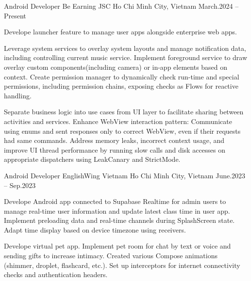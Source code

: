 \begin{cventries}

    \cventry
    {Android Developer}
    {Be Earning JSC}
    {Ho Chi Minh City, Vietnam}
    {March.2024 -- Present}
    {
        \begin{cvitems}
            \item {
                Develope launcher feature to manage user apps alongside enterprise web apps.
            }
            \item {
                Leverage system services to overlay system layouts and manage notification data, including controlling current music service.
                Implement foreground service to draw overlay custom components(including camera) or in-app elements based on context.
                Create permission manager to dynamically check run-time and special permissions, including permission chains, exposing checks as Flows for reactive handling.
            }
            \item {
                Separate business logic into use cases from UI layer to facilitate sharing between activities and services.
                Enhance WebView interaction pattern: Communicate using enums and sent responses only to correct WebView, even if their requests had same commands.
                Address memory leaks, incorrect context usage, and improve UI thread performance by running slow calls and disk accesses on appropriate dispatchers using LeakCanary and StrictMode.
            }
        \end{cvitems}
    }

    \cventry
    {Android Developer}
    {EnglishWing Vietnam}
    {Ho Chi Minh City, Vietnam}
    {June.2023 -- Sep.2023}
    {
        \begin{cvitems}
            \item {
                Develope Android app connected to Supabase Realtime for admin users to manage real-time user information and update latest class time in user app.
                Implement preloading data and real-time channels during SplashScreen state.
                Adapt time display based on device timezone using receivers.
            }
            \item {
                Develope virtual pet app.
                Implement pet room for chat by text or voice and sending gifts to increase intimacy.
                Created various Compose animations (shimmer, droplet, flashcard, etc.).
                Set up interceptors for internet connectivity checks and authentication headers.
            }
        \end{cvitems}
    }

\end{cventries}
